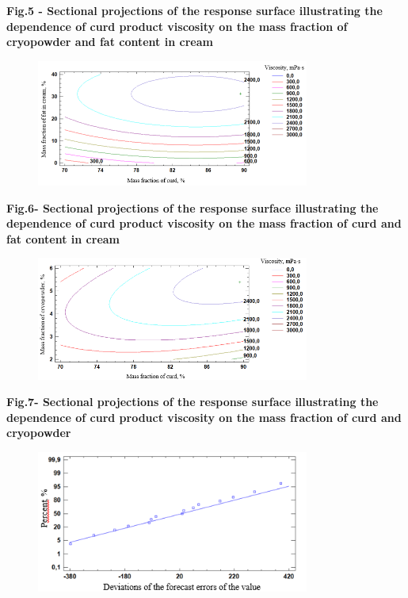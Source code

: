 {\bfseries Fig.5 - Sectional projections of the response surface
illustrating the dependence of curd product viscosity on the mass
fraction of cryopowder and fat content in cream}


\begin{figure}[H]
	\centering
	\includegraphics[width=0.8\textwidth]{media/pish2/image86}
	\caption*{}
\end{figure}


{\bfseries Fig.6- Sectional projections of the response surface
illustrating the dependence of curd product viscosity on the mass
fraction of curd and fat content in cream}


\begin{figure}[H]
	\centering
	\includegraphics[width=0.8\textwidth]{media/pish2/image87}
	\caption*{}
\end{figure}


{\bfseries Fig.7- Sectional projections of the response surface
illustrating the dependence of curd product viscosity on the mass
fraction of curd and cryopowder}


\begin{figure}[H]
	\centering
	\includegraphics[width=0.8\textwidth]{media/pish2/image88}
	\caption*{}
\end{figure}


